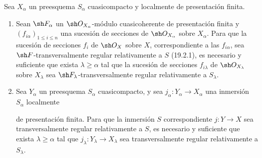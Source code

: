 \begin{proposition}[19.8.2]
\label{IV.19.8.2}
Sea $X_\alpha$ un preesquema $S_\alpha$ cuasicompacto y localmente de presentación finita.
\begin{enumerate}
  \item[\textup{(i)}] Sean $\sh F_\alpha$ un $\sh O_{X_\alpha}$-módulo cuasicoherente de presentación finita y $(f_{i\alpha})_{1\leq i\leq n}$ una sucesión de secciones de $\sh O_{X_\alpha}$ sobre $X_\alpha$. Para que la sucesión de secciones $f_i$ de $\sh O_X$ sobre $X$, correspondiente a las $f_{i\alpha}$, sea $\sh F$-transversalmente regular relativamente a $S$ \textup{(19.2.1)}, es necesario y suficiente que exista $\lambda\geq\alpha$ tal que la sucesión de secciones $f_{i\lambda}$ de $\sh O_{X_\lambda}$ sobre $X_\lambda$ sea $\sh F_\lambda$-transversalmente regular relativamente a $S_\lambda$.
  \item[\textup{(ii)}] Sea $Y_\alpha$ un preesquema $S_\alpha$ cuasicompacto, y sea $j_\alpha:Y_\alpha\to X_\alpha$ una inmersión $S_\alpha$ localmente


  de presentación finita. Para que la inmersión $S$ correspondiente $j:Y\to X$ sea transversalmente regular relativamente a $S$, es necesario y suficiente que exista $\lambda\geq\alpha$ tal que $j_\lambda:Y_\lambda\to X_\lambda$ sea transversalmente regular relativamente a $S_\lambda$.
\end{enumerate}
\end{proposition}

